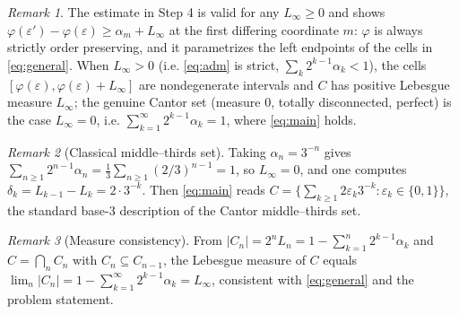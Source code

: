 \documentclass{amsart}
\theoremstyle{definition}
\theoremstyle{remark}
\newtheorem{remark}{Remark}
\begin{document}
\begin{remark}
The estimate in Step 4 is valid for any $L_\infty\ge0$ and shows
$\varphi(\varepsilon')-\varphi(\varepsilon)\ge\alpha_m+L_\infty$ at the first
differing coordinate $m$: $\varphi$ is always strictly order preserving, and it
parametrizes the left endpoints of the cells in \eqref{eq:general}. When
$L_\infty>0$ (i.e. \eqref{eq:adm} is strict, $\sum_{k}2^{k-1}\alpha_k<1$), the
cells $[\varphi(\varepsilon),\varphi(\varepsilon)+L_\infty]$ are nondegenerate
intervals and $C$ has positive Lebesgue measure $L_\infty$; the genuine Cantor set
(measure $0$, totally disconnected, perfect) is the case $L_\infty=0$, i.e.
$\sum_{k=1}^{\infty}2^{k-1}\alpha_k=1$, where \eqref{eq:main} holds.
\end{remark}

\begin{remark}[Classical middle--thirds set]
Taking $\alpha_n=3^{-n}$ gives $\sum_{n\ge1}2^{n-1}\alpha_n=\tfrac13\sum_{n\ge1}(2/3)^{n-1}=1$,
so $L_\infty=0$, and one computes $\delta_k=L_{k-1}-L_k=2\cdot3^{-k}$. Then
\eqref{eq:main} reads
$C=\bigl\{\sum_{k\ge1}2\varepsilon_k 3^{-k}:\varepsilon_k\in\{0,1\}\bigr\}$, the
standard base-$3$ description of the Cantor middle--thirds set.
\end{remark}

\begin{remark}[Measure consistency]
From $|C_n|=2^nL_n=1-\sum_{k=1}^n2^{k-1}\alpha_k$ and $C=\bigcap_nC_n$ with
$C_{n}\subseteq C_{n-1}$, the Lebesgue measure of $C$ equals
$\lim_n|C_n|=1-\sum_{k=1}^{\infty}2^{k-1}\alpha_k=L_\infty$, consistent with
\eqref{eq:general} and the problem statement.
\end{remark}
\end{document}
